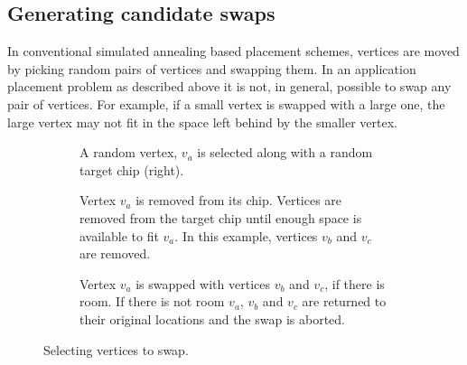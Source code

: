 		\subsection{Generating candidate swaps}
			
			In conventional simulated annealing based placement schemes, vertices are
			moved by picking random pairs of vertices and swapping them. In an
			application placement problem as described above it is not, in general,
			possible to swap any pair of vertices. For example, if a small vertex is
			swapped with a large one, the large vertex may not fit in the space left
			behind by the smaller vertex.
				
			\begin{figure}
				\center
				\begin{subfigure}{\linewidth}
					\center
					\caption{A random vertex, $v_a$ is selected along with a random
					target chip (right).}
					\label{fig:sa-swap-select}
				\end{subfigure}
				
				\vspace*{1em}
				
				\begin{subfigure}{\linewidth}
					\center
					\caption{Vertex $v_a$ is removed from its chip. Vertices are removed
					from the target chip until enough space is available to fit $v_a$.
					In this example, vertices $v_b$ and $v_c$ are removed.}
					\label{fig:sa-swap-remove}
				\end{subfigure}
				
				\vspace*{1em}
				
				\begin{subfigure}{\linewidth}
					\center
					\caption{Vertex $v_a$ is swapped with vertices $v_b$ and $v_c$, if
					there is room. If there is not room $v_a$, $v_b$ and $v_c$ are
					returned to their original locations and the swap is aborted.}
					\label{fig:sa-swap-commit}
				\end{subfigure}
				
				\caption{Selecting vertices to swap.}
				\label{fig:sa-swap}
			\end{figure}
			
